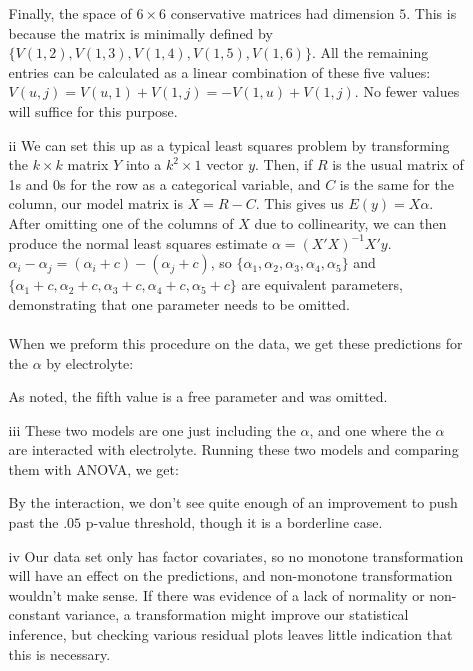 \documentclass[11pt]{article}
\theoremstyle{definition}
\begin{document}
\begin{itemize}
\begin{itemize}
                Finally, the space of $6\times 6$ conservative matrices had dimension $5$. This is because the matrix is minimally defined by \(\{V(1,2),V(1,3),V(1,4),V(1,5),V(1,6)\}\). All the remaining entries can be calculated as a linear combination of these five values: \(V(u,j) = V(u,1)+V(1,j) = -V(1,u)+V(1,j)\). No fewer values will suffice for this purpose. 
            \item[ii]
                We can set this up as a typical least squares problem by transforming the $k\times k$ matrix $Y$ into a $k^2\times 1$ vector $y$. Then, if $R$ is the usual matrix of 1s and 0s for the row as a categorical variable, and $C$ is the same for the column, our model matrix is $X=R-C$. This gives us \(E(y)=X\alpha\). After omitting one of the columns of $X$ due to collinearity, we can then produce the normal least squares estimate $\alpha=(X'X)^{-1}X'y$. \(\alpha_i-\alpha_j = (\alpha_i+c) - (\alpha_j+c)\), so \(\{\alpha_1,\alpha_2,\alpha_3,\alpha_4,\alpha_5\}\) and \(\{\alpha_1+c,\alpha_2+c,\alpha_3+c,\alpha_4+c,\alpha_5+c\}\) are equivalent parameters, demonstrating that one parameter needs to be omitted.\\
                \vspace{5mm} \\
                When we preform this procedure on the data, we get these predictions for the $\alpha$ by electrolyte:
                \FloatBarrier
                
                \FloatBarrier
                As noted, the fifth value is a free parameter and was omitted.
            \item[iii]
                These two models are one just including the $\alpha$, and one where the $\alpha$ are interacted with electrolyte. Running these two models and comparing them with ANOVA, we get:
                \FloatBarrier
                
                \FloatBarrier
                By the interaction, we don't see quite enough of an improvement to push past the $.05$ p-value threshold, though it is a borderline case.
            \item[iv]
                Our data set only has factor covariates, so no monotone transformation will have an effect on the predictions, and non-monotone transformation wouldn't make sense. If there was evidence of a lack of normality or non-constant variance, a transformation might improve our statistical inference, but checking various residual plots leaves little indication that this is necessary.
        \end{itemize}

\end{itemize}
\end{document}
